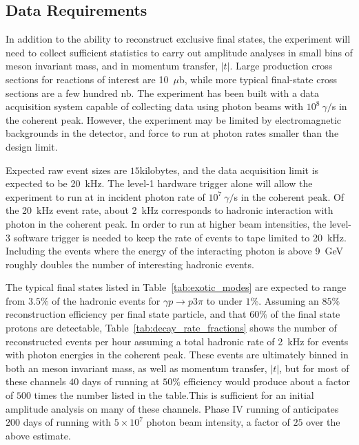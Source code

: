 \subsection{Data Requirements \label{sec:intro:data_requirements}}
In addition to the ability to reconstruct exclusive final states, the \GX{} experiment
will need to collect sufficient statistics to carry out amplitude analyses in small bins 
of meson invariant mass, and in momentum transfer, $|t|$. Large production cross
sections for reactions of interest are 10~$\mu$b, while more typical final-state 
cross sections are a few hundred nb. The \GX{} experiment has been built with a 
data acquisition system capable of collecting data using photon beams with $10^{8}~\gamma/$s
in the coherent peak. However, the experiment may be limited by electromagnetic backgrounds
in the detector, and force to run at photon  rates smaller than the design limit.

Expected raw event sizes are $15$kilobytes, and the data acquisition limit is expected to 
be 20~kHz. The level-1 hardware trigger alone will allow the experiment to run 
at in incident photon rate of $10^{7}~\gamma/$s in the coherent peak. Of the 20~kHz
event rate, about 2~kHz corresponds to hadronic interaction with photon in the coherent
peak. In order to run at higher beam intensities, the level-3 software trigger is needed to 
keep the rate of events to tape limited to 20~kHz. Including the events where the energy
of the interacting photon is above 9~GeV roughly doubles the number of interesting hadronic
events. 

The typical final states listed in Table~\ref{tab:exotic_modes} are expected to range from $3.5\%$ 
of the hadronic events for $\gamma p \rightarrow p 3\pi$ to under $1\%$. Assuming an $85\%$
reconstruction efficiency per final state particle, and that $60\%$ of the final state protons
are detectable, Table~\ref{tab:decay_rate_fractions} shows the number of reconstructed events per
hour assuming a total hadronic rate of 2~kHz for events with photon energies in the coherent
peak. These events are ultimately binned in both an meson invariant mass, as well as momentum
transfer, $|t|$, but for most of these channels $40$ days of running at $50\%$ efficiency would 
produce about a factor of $500$ times the number listed in the table.This is sufficient for
an initial amplitude analysis on many of these channels. Phase IV running of \GX{} anticipates 
$200$ days of running with $5\times  10^{7}$ photon beam intensity, a factor of $25$ over the
above estimate.

